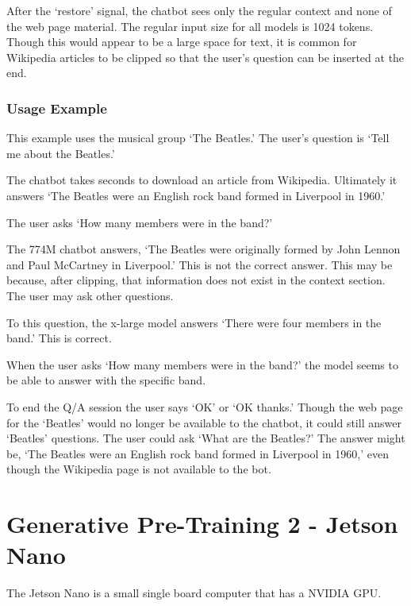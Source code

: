 After the `restore' signal, the chatbot sees only the regular context and none of the web page material. The regular input size for all models is 1024 tokens. %
Though this would appear to be a large space for text, it is common for Wikipedia articles to be clipped so that the user's question can be inserted at the end.

\subsubsection{Usage Example}

This example uses the musical group `The Beatles.' The user's question is `Tell me about the Beatles.'

The chatbot takes seconds to download an article from Wikipedia. Ultimately it answers `The Beatles were an English rock band formed in Liverpool in 1960.'

The user asks `How many members were in the band?'

The 774M chatbot answers, `The Beatles were originally formed by John Lennon and Paul McCartney in Liverpool.' This is not the correct answer. This may be because, after clipping, that information does not exist in the context section. The user may ask other questions. %

To this question, the x-large model answers `There were four members in the band.' This is correct.

When the user asks `How many members were in the band?' the model seems to be able to answer with the specific band. %

To end the Q/A session the user says `OK' or `OK thanks.' Though the web page for the `Beatles' would no longer be available to the chatbot, it could still answer `Beatles'  questions. The user could ask `What are the Beatles?' The answer might be, `The Beatles were an English rock band formed in Liverpool in 1960,' even though the Wikipedia page is not available to the bot.

\label{chapter-xlarge}

\section{Generative Pre-Training 2 - Jetson Nano}

\label{chapter-nano}
The Jetson Nano is a small single board computer that has a NVIDIA GPU. %

